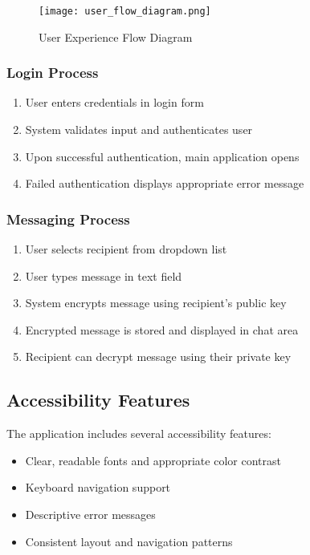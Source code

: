 \documentclass[12pt,a4paper]{article}
\begin{document}
\begin{figure}[H]
    \centering
    \texttt{[image: user\_flow\_diagram.png]}
    \caption{User Experience Flow Diagram}
    \label{fig:userflow}
\end{figure}

\subsubsection{Login Process}

\begin{enumerate}
    \item User enters credentials in login form
    \item System validates input and authenticates user
    \item Upon successful authentication, main application opens
    \item Failed authentication displays appropriate error message
\end{enumerate}

\subsubsection{Messaging Process}

\begin{enumerate}
    \item User selects recipient from dropdown list
    \item User types message in text field
    \item System encrypts message using recipient's public key
    \item Encrypted message is stored and displayed in chat area
    \item Recipient can decrypt message using their private key
\end{enumerate}

\subsection{Accessibility Features}

The application includes several accessibility features:

\begin{itemize}
    \item Clear, readable fonts and appropriate color contrast
    \item Keyboard navigation support
    \item Descriptive error messages
    \item Consistent layout and navigation patterns
\end{itemize}
\end{document}

